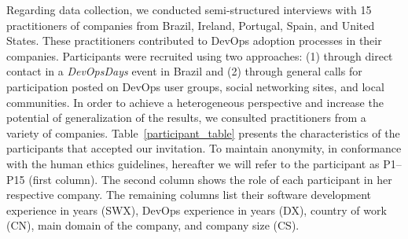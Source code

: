 

Regarding data collection, we conducted semi-structured interviews with 15 practitioners of companies from
Brazil, Ireland, Portugal, Spain, and United States. These practitioners
contributed to DevOps adoption processes in their companies. Participants
were recruited using two approaches: (1) through direct contact in a \emph{DevOpsDays}
event in Brazil and (2) through  general
calls for participation posted on DevOps user groups, social networking sites,
and local communities. In order to achieve a heterogeneous perspective
and increase the potential of generalization of the results,
we consulted practitioners from a variety of companies.
Table~\ref{participant_table} presents the characteristics of the participants
that accepted our invitation.
To maintain anonymity, in conformance with the human ethics guidelines,
hereafter we will refer to the participant as P1--P15 (first column).
The second column shows the role of
each participant in her respective company. The remaining columns list their
software development experience in years (SWX), DevOps experience in years (DX),
country of work (CN), main domain of the company, and company size (CS).


